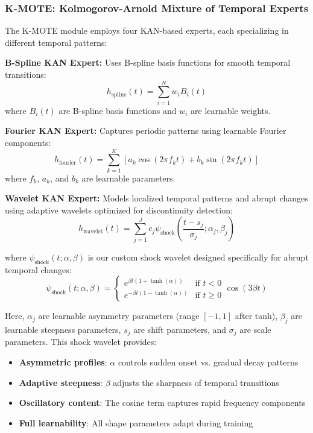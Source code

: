 \documentclass[conference]{IEEEtran}
\begin{document}
\subsubsection{K-MOTE: Kolmogorov-Arnold Mixture of Temporal Experts}

The K-MOTE module employs four KAN-based experts, each specializing in different temporal patterns:

\textbf{B-Spline KAN Expert:} Uses B-spline basis functions for smooth temporal transitions:
\begin{equation}
h_{\text{spline}}(t) = \sum_{i=1}^{N} w_i B_i(t)
\end{equation}
where $B_i(t)$ are B-spline basis functions and $w_i$ are learnable weights.

\textbf{Fourier KAN Expert:} Captures periodic patterns using learnable Fourier components:
\begin{equation}
h_{\text{fourier}}(t) = \sum_{k=1}^{K} [a_k \cos(2\pi f_k t) + b_k \sin(2\pi f_k t)]
\end{equation}
where $f_k$, $a_k$, and $b_k$ are learnable parameters.

\textbf{Wavelet KAN Expert:} Models localized temporal patterns and abrupt changes using adaptive wavelets optimized for discontinuity detection:
\begin{equation}
h_{\text{wavelet}}(t) = \sum_{j=1}^{J} c_j \psi_{\text{shock}}\left(\frac{t - s_j}{\sigma_j}; \alpha_j, \beta_j\right)
\end{equation}

where $\psi_{\text{shock}}(t; \alpha, \beta)$ is our custom shock wavelet designed specifically for abrupt temporal changes:
\begin{equation}
\psi_{\text{shock}}(t; \alpha, \beta) = \begin{cases} 
e^{\beta t(1 + \tanh(\alpha))} & \text{if } t < 0 \\
e^{-\beta t(1 - \tanh(\alpha))} & \text{if } t \geq 0
\end{cases} \cos(3\beta t)
\end{equation}

Here, $\alpha_j$ are learnable asymmetry parameters (range $[-1,1]$ after tanh), $\beta_j$ are learnable steepness parameters, $s_j$ are shift parameters, and $\sigma_j$ are scale parameters. This shock wavelet provides:
\begin{itemize}
\item \textbf{Asymmetric profiles}: $\alpha$ controls sudden onset vs. gradual decay patterns
\item \textbf{Adaptive steepness}: $\beta$ adjusts the sharpness of temporal transitions  
\item \textbf{Oscillatory content}: The cosine term captures rapid frequency components
\item \textbf{Full learnability}: All shape parameters adapt during training
\end{itemize}
\end{document}
